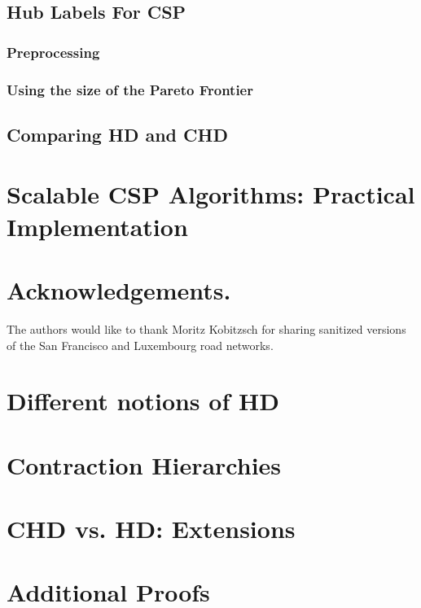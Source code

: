 \documentclass[format=acmsmall, screen=true]{acmart}
\begin{document}
\subsection{Hub Labels For CSP}
\label{ssec:hlcsp}


\subsubsection{Preprocessing}
\label{sec:preproc}


\subsubsection{Using the size of the Pareto Frontier}


\subsection{Comparing HD and CHD}
\label{ssec:hdvschd}


\section{Scalable CSP Algorithms: Practical Implementation}
\label{sec:numeric}



\section*{Acknowledgements.}
The authors would like to thank Moritz Kobitzsch for sharing sanitized versions of the San Francisco and Luxembourg road networks.


\appendix
\section{Different notions of HD}
\label{app:generalhd}


\section{Contraction Hierarchies}


\section{CHD vs. HD: Extensions}
\label{app:extn}



\section{Additional Proofs}
\label{sec:proofs}




\end{document}
